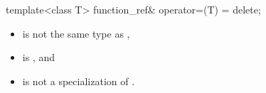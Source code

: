 \begin{wgText}
\begin{itemdecl}
template<class T> function_ref& operator=(T) = delete;
\end{itemdecl}

\begin{itemdescr}
\pnum
\constraints
\begin{itemize}
\item {} is not the same type as ,
\item {} is , and
\item {} is not a specialization of .
\end{itemize}
\end{itemdescr}
\end{wgText}



